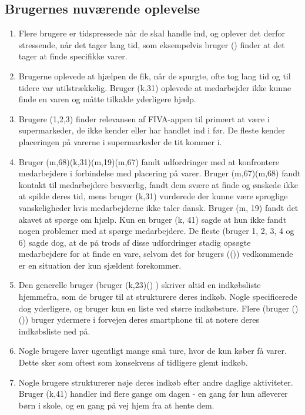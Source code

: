 \documentclass[12pt]{article}
\begin{document}
\subsection{Brugernes nuværende oplevelse}
\begin{enumerate}
\item Flere brugere er tidspressede når de skal handle ind, og oplever det derfor stressende, når det tager lang tid, som eksempelvis bruger () finder at det tager at finde specifikke varer.

\item Brugerne oplevede at hjælpen de fik, når de spurgte, ofte tog lang tid og til tidere var utilstrækkelig. Bruger (k,31) oplevede at medarbejder ikke kunne finde en varen og måtte tilkalde yderligere hjælp.

\item Brugere (1,2,3) finder relevansen af FIVA-appen til primært at være i supermarkeder, de ikke kender eller har handlet ind i før. De fleste kender placeringen på varerne i supermarkeder de tit kommer i.

\item Bruger (m,68)(k,31)(m,19)(m,67) fandt udfordringer med at konfrontere medarbejdere i forbindelse med placering på varer. Bruger (m,67)(m,68) fandt kontakt til medarbejdere besværlig, fandt dem svære at finde og ønskede ikke at spilde deres tid, mens bruger (k,31) vurderede der kunne være sproglige vanskeligheder hvis medarbejderne ikke taler dansk. Bruger (m, 19) fandt det akavet at spørge om hjælp. Kun en bruger (k, 41) sagde at hun ikke fandt nogen problemer med at spørge medarbejdere. De fleste (bruger 1, 2, 3, 4 og 6) sagde dog, at de på trods af disse udfordringer stadig opsøgte medarbejdere for at finde en vare, selvom det for brugers (()) vedkommende er en situation der kun sjældent forekommer.

\item Den generelle bruger (bruger (k,23)() ) skriver altid en indkøbsliste hjemmefra, som de bruger til at strukturere deres indkøb. Nogle specificerede dog yderligere, og bruger kun en liste ved større indkøbsture. Flere (bruger ()()) bruger ydermere i forvejen deres smartphone til at notere deres indkøbsliste ned på. 

\item Nogle brugere laver ugentligt mange små ture, hvor de kun køber få varer. Dette sker som oftest som konsekvens af tidligere glemt indkøb.

\item Nogle brugere strukturerer nøje deres indkøb efter andre daglige aktiviteter. Bruger (k,41) handler ind flere gange om dagen - en gang før hun afleverer børn i skole, og en gang på vej hjem fra at hente dem.
\end{enumerate}
\end{document}

